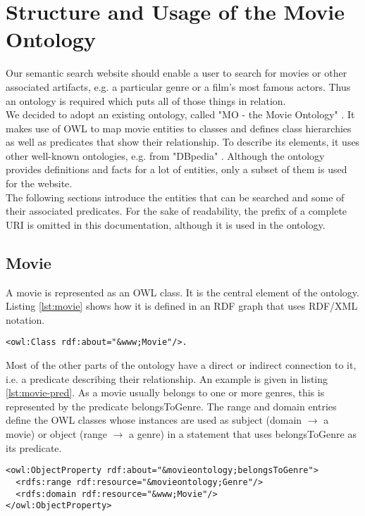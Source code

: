 \section{Structure and Usage of the Movie Ontology}
\label{sec:ontology}
Our semantic search website should enable a user to search for movies or other associated artifacts, e.g. a particular genre or a film's most famous actors. Thus an ontology is required which puts all of those things in relation. \\
We decided to adopt an existing ontology, called "MO - the Movie Ontology" \cite{bouza:movieontology}. It makes use of OWL to map movie entities to classes and defines class hierarchies as well as predicates that show their relationship. To describe its elements, it uses other well-known ontologies, e.g. from "DBpedia" \cite{dbpedia-swj}. Although the ontology provides definitions and facts for a lot of entities, only a subset of them is used for the website. \\
The following sections introduce the entities that can be searched and some of their associated predicates. For the sake of readability, the prefix of a complete URI is omitted in this documentation, although it is used in the ontology.

\subsection{Movie}
A movie is represented as an OWL class. It is the central element of the ontology. Listing \ref{lst:movie} shows how it is defined in an RDF graph that uses RDF/XML notation.

\begin{lstlisting}[caption={OWL Movie Class in RDF/XML notation},label={lst:movie}]
<owl:Class rdf:about="&www;Movie"/>.
\end{lstlisting}

Most of the other parts of the ontology have a direct or indirect connection to it, i.e. a predicate describing their relationship. An example is given in listing \ref{lst:movie-pred}. As a movie usually belongs to one or more genres, this is represented by the predicate belongsToGenre. The range and domain entries define the OWL classes whose instances are used as subject (domain $\rightarrow$ a movie) or object (range $\rightarrow$ a genre) in a statement that uses belongsToGenre as its predicate.

\begin{lstlisting}[caption={Exemplary Movie predicate in RDF/XML notation},label={lst:movie-pred}]
<owl:ObjectProperty rdf:about="&movieontology;belongsToGenre">
  <rdfs:range rdf:resource="&movieontology;Genre"/>
  <rdfs:domain rdf:resource="&www;Movie"/>
</owl:ObjectProperty>
\end{lstlisting}

